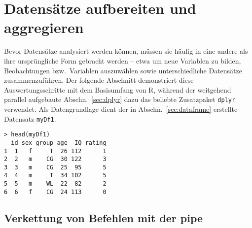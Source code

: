 \section{Datensätze aufbereiten und aggregieren}
\label{sec:dfTransform}

Bevor Datensätze analysiert werden können, müssen sie häufig in eine andere als ihre ursprüngliche Form gebracht werden -- etwa um neue Variablen zu bilden, Beobachtungen bzw.\ Variablen auszuwählen sowie unterschiedliche Datensätze zusammenzuführen. Der folgende Abschnitt demonstriert diese Auswertungsschritte mit dem Basisumfang von R, während der weitgehend parallel aufgebaute Abschn.\ \ref{sec:dplyr} dazu das beliebte Zusatzpaket \lstinline!dplyr! verwendet. Als Datengrundlage dient der in Abschn.\ \ref{sec:dataframe} erstellte Datensatz \lstinline!myDf1!.
\begin{lstlisting}
> head(myDf1)
  id sex group age  IQ rating
1  1   f     T  26 112      1
2  2   m    CG  30 122      3
3  3   m    CG  25  95      5
4  4   m     T  34 102      5
5  5   m    WL  22  82      2
6  6   f    CG  24 113      0
\end{lstlisting}

\subsection{Verkettung von Befehlen mit der pipe}
\label{sec:df_pipe}

